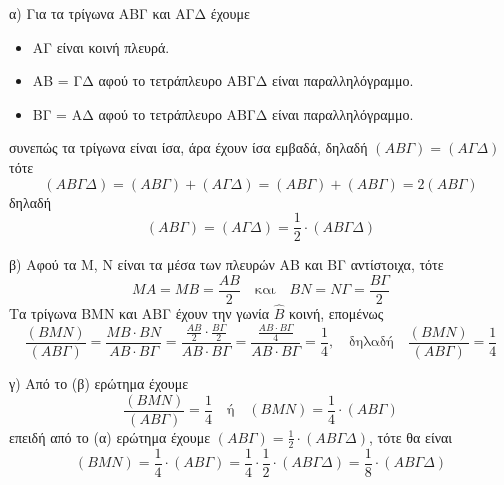 \begin{alist}
\item
α) Για τα τρίγωνα ΑΒΓ και ΑΓΔ έχουμε
\begin{itemize}
    \item ΑΓ είναι κοινή πλευρά.
    \item ΑΒ = ΓΔ αφού το τετράπλευρο ΑΒΓΔ είναι παραλληλόγραμμο.
    \item ΒΓ = ΑΔ αφού το τετράπλευρο ΑΒΓΔ είναι παραλληλόγραμμο.
\end{itemize}
συνεπώς τα τρίγωνα είναι ίσα, άρα έχουν ίσα εμβαδά, δηλαδή $(ΑΒ\Gamma) = (Α\Gamma\Delta)$
τότε
\[ (ΑΒ\Gamma\Delta) = (ΑΒ\Gamma) + (Α\Gamma\Delta) = (ΑΒ\Gamma) + (ΑΒ\Gamma) = 2(ΑΒ\Gamma) \]
δηλαδή
\[ (ΑΒ\Gamma) = (Α\Gamma\Delta) = \frac{1}{2} \cdot (ΑΒ\Gamma\Delta) \]

\item
β) Αφού τα Μ, Ν είναι τα μέσα των πλευρών ΑΒ και ΒΓ αντίστοιχα, τότε
\[ ΜΑ = ΜΒ = \frac{ΑΒ}{2} \quad \text{και} \quad ΒΝ = ΝΓ = \frac{ΒΓ}{2} \]
Τα τρίγωνα BMN και ΑΒΓ έχουν την γωνία $\hat{Β}$ κοινή, επομένως
\[ \frac{(ΒΜΝ)}{(ΑΒ\Gamma)} = \frac{ΜΒ \cdot ΒΝ}{ΑΒ \cdot ΒΓ} = \frac{\frac{ΑΒ}{2} \cdot \frac{ΒΓ}{2}}{ΑΒ \cdot ΒΓ} = \frac{\frac{ΑΒ \cdot ΒΓ}{4}}{ΑΒ \cdot ΒΓ} = \frac{1}{4}, \quad \text{δηλαδή} \quad \frac{(ΒΜΝ)}{(ΑΒ\Gamma)} = \frac{1}{4} \]

\item
γ) Από το (β) ερώτημα έχουμε
\[ \frac{(ΒΜΝ)}{(ΑΒ\Gamma)} = \frac{1}{4} \quad \text{ή} \quad (ΒΜΝ) = \frac{1}{4} \cdot (ΑΒ\Gamma) \]
επειδή από το (α) ερώτημα έχουμε $(ΑΒ\Gamma) = \frac{1}{2} \cdot (ΑΒ\Gamma\Delta)$, τότε θα είναι
\[ (ΒΜΝ) = \frac{1}{4} \cdot (ΑΒ\Gamma) = \frac{1}{4} \cdot \frac{1}{2} \cdot (ΑΒ\Gamma\Delta) = \frac{1}{8} \cdot (ΑΒ\Gamma\Delta) \]
\end{alist}